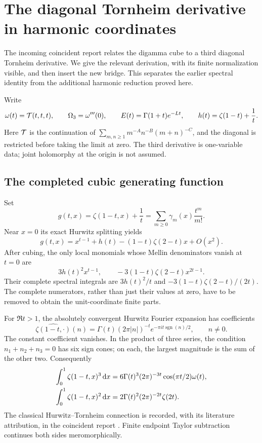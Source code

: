\section{The diagonal Tornheim derivative in harmonic coordinates}
\label{sec:diagonal}

The incoming coincident report relates the digamma cube to a third
diagonal Tornheim derivative. We give the relevant derivation, with
its finite normalization visible, and then insert the new bridge.
This separates the earlier spectral identity from the additional
harmonic reduction proved here.

Write
\[
 \omega(t)=\mathcal T(t,t,t),\qquad \Omega_3=\omega'''(0),\qquad
 E(t)=\Gamma(1+t)e^{-Lt},\qquad
 h(t)=\zeta(1-t)+\frac1t.
\]
Here $\mathcal T$ is the continuation of
$\sum_{m,n\ge1}m^{-A}n^{-B}(m+n)^{-C}$, and the diagonal is
restricted before taking the limit at zero. The third derivative is
one-variable data; joint holomorphy at the origin is not assumed.

\subsection{The completed cubic generating function}

Set
\[
 g(t,x)=\zeta(1-t,x)+\frac1t
       =\sum_{m\ge0}\gamma_m(x)\frac{t^m}{m!}.
\]
Near $x=0$ its exact Hurwitz splitting yields
\begin{equation}\label{diag:local}
 g(t,x)=x^{t-1}+h(t)-(1-t)\zeta(2-t)x+O(x^2).
\end{equation}
After cubing, the only local monomials whose Mellin denominators
vanish at $t=0$ are
\[
 3h(t)^2x^{t-1},\qquad
 -3(1-t)\zeta(2-t)x^{2t-1}.
\]
Their complete spectral integrals are $3h(t)^2/t$ and
$-3(1-t)\zeta(2-t)/(2t)$. The complete numerators, rather than
just their values at zero, have to be removed to obtain the
unit-coordinate finite parts.

For $\Re t>1$, the absolutely convergent Hurwitz Fourier expansion
has coefficients
\[
 \widehat{\zeta(1-t,\cdot)}(n)
 =\Gamma(t)(2\pi|n|)^{-t}
             e^{-\pi i t\operatorname{sgn}(n)/2},\qquad n\ne0.
\]
The constant coefficient vanishes. In the product of three series,
the condition $n_1+n_2+n_3=0$ has six sign cones; on each, the
largest magnitude is the sum of the other two. Consequently
\begin{align}
 \int_0^1\zeta(1-t,x)^3\,\mathrm d x
 &=6\Gamma(t)^3(2\pi)^{-3t}\cos(\pi t/2)\omega(t),\notag\\
 \int_0^1\zeta(1-t,x)^2\,\mathrm d x
 &=2\Gamma(t)^2(2\pi)^{-2t}\zeta(2t).
 \label{diag:Fourier}
\end{align}
The classical Hurwitz--Tornheim connection is recorded, with its
literature attribution, in the coincident report
\cite{IncomingCoincident}. Finite endpoint Taylor subtraction
continues both sides meromorphically.

